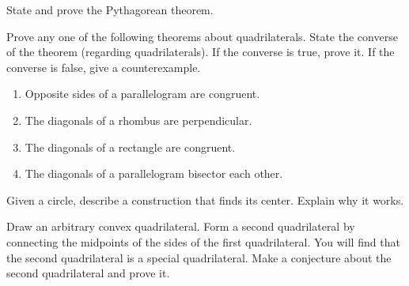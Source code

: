 \begin{prob}
State and prove the Pythagorean theorem.
\end{prob}

\begin{prob}
Prove any one of the following theorems about quadrilaterals.  State the converse of the theorem (regarding quadrilaterals).  If the converse is true, prove it.  If the converse is false, give a counterexample.  
\begin{enumerate}
\item Opposite sides of a parallelogram are congruent.
\item The diagonals of a rhombus are perpendicular.
\item The diagonals of a rectangle are congruent.
\item The diagonals of a parallelogram bisector each other.
\end{enumerate}
\end{prob}

\begin{prob}
Given a circle, describe a construction that finds its center.  Explain why it works.  
\end{prob}

\begin{prob}
Draw an arbitrary convex quadrilateral.  Form a second quadrilateral by connecting the 
midpoints of the sides of the first quadrilateral.  You will find that the second quadrilateral 
is a special quadrilateral.  Make a conjecture about the second quadrilateral and prove it.  
\end{prob}

%
